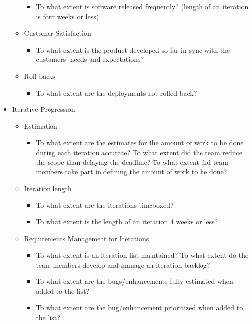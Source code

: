 \begin{appendices}
\begin{itemize}
\begin{itemize}
\begin{itemize}
					\item To what extent is software released frequently? (length of an iteration is four weeks or less)
				\end{itemize}
			\item Customer Satisfaction
				\begin{itemize}
					\item To what extent is the product developed so far in-sync with the customers' needs and expectations?
				\end{itemize}
			\item Roll-backs
				\begin{itemize}
					\item To what extent are the deployments not rolled back?
				\end{itemize}
		\end{itemize}
	\item Iterative Progression
		\begin{itemize}
			\item Estimation
				\begin{itemize}
					\item To what extent are the estimates for the amount of work to be done during each iteration accurate?
					\addition To what extent did the team reduce the scope than delaying the deadline?
					\addition To what extent did team members take part in defining the amount of work to be done?
				\end{itemize}
			\item Iteration length
				\begin{itemize}
					\item To what extent are the iterations timeboxed?
					\item To what extent is the length of an iteration 4 weeks or less?
				\end{itemize}
			\item Requirements Management for Iterations
				\begin{itemize}
					\item To what extent is an iteration list maintained?
					\addition To what extent do the team members develop and manage an iteration backlog?
					\item To what extent are the bugs/enhancements fully estimated when added to the list?
					\item To what extent are the bug/enhancement prioritized when added to the list?
				\end{itemize}

\end{itemize}
\end{itemize}
\end{appendices}
